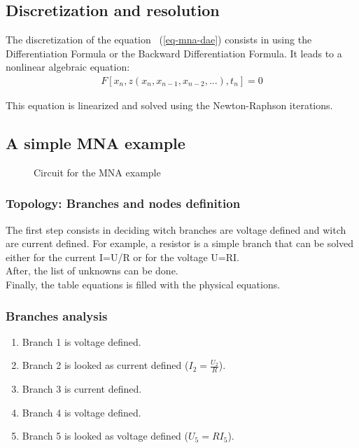 \subsection {Discretization and resolution}

The discretization of the equation ~(\ref{eq-mna-dae}) consists in using the Differentiation Formula
or the Backward Differentiation Formula. It leads to a nonlinear algebraic equation:
\begin{eqnarray}
F[x_{n},z(x_{n},x_{n-1},x_{n-2},...),t_{n}]=0
\end{eqnarray}

This equation is linearized and solved using the Newton-Raphson iterations.




\newpage
\subsection{A simple MNA example}
\begin{figure}[h]
\centerline{
 \scalebox{0.6}{
    
 }
}
\caption{Circuit for the MNA example}
\label{fig-MNA-example}
\end{figure}
\subsubsection{Topology: Branches and nodes definition}
The first step consists in deciding witch branches are voltage defined and witch are current
defined. For example, a resistor is a simple branch that can be solved either for the current I=U/R or for the
voltage U=RI. \\
After, the list of unknowns can be done. \\
Finally, the table equations is filled with the physical equations. 

\subsubsection{Branches analysis}

\begin{enumerate}
\item Branch 1 is voltage defined.
\item Branch 2 is looked as current defined ($I_{2}=\frac{U_{2}}{R}$).
\item Branch 3 is current defined.
\item Branch 4 is voltage defined.
\item Branch 5 is looked as voltage defined ($U_{5}=RI_{5}$).
\end{enumerate}
